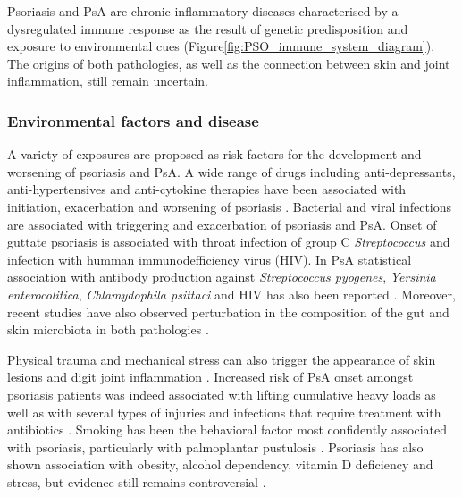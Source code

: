 Psoriasis and PsA are chronic inflammatory diseases characterised by a dysregulated immune response as the result of genetic predisposition and exposure to environmental cues (Figure\ref{fig:PSO_immune_system_diagram}). The origins of both pathologies, as well as the connection between skin and joint inflammation, still remain uncertain.


\subsubsection*{Environmental factors and disease}
A variety of exposures are proposed as risk factors for the development and worsening of psoriasis and PsA. A wide range of drugs including anti-depressants, anti-hypertensives and anti-cytokine therapies have been associated with initiation, exacerbation and worsening of psoriasis \parencite{Kim2010}. Bacterial and viral infections are associated with triggering and exacerbation of psoriasis and PsA. Onset of guttate psoriasis is associated with throat infection of group C \textit{Streptococcus} and infection with humman immunodefficiency virus (HIV). In PsA statistical association with antibody production against \textit{Streptococcus pyogenes}, \textit{Yersinia enterocolitica}, \textit{ Chlamydophila psittaci} and HIV has also been reported \parencite{Gudjonsson2003,Valdimarsson2009,Diluvio2006,Thrastardottir2018}. Moreover, recent studies have also observed perturbation in the composition of the gut and skin microbiota in both pathologies \parencite{Eppinga2014, Yan2017}.

Physical trauma and mechanical stress can also trigger the appearance of skin lesions and digit joint inflammation \parencite {Weiss2002,Nestle2009}. Increased risk of PsA onset amongst psoriasis patients was indeed associated with lifting cumulative heavy loads as well as with several types of injuries and infections that require treatment with antibiotics \parencite{Eder2011}. Smoking has been the behavioral factor most confidently associated with psoriasis, particularly with palmoplantar pustulosis \parencite{Armstrong2014}. Psoriasis has also shown association with obesity, alcohol dependency, vitamin D deficiency and stress, but evidence still remains controversial \parencite{Meglio2014}. 


